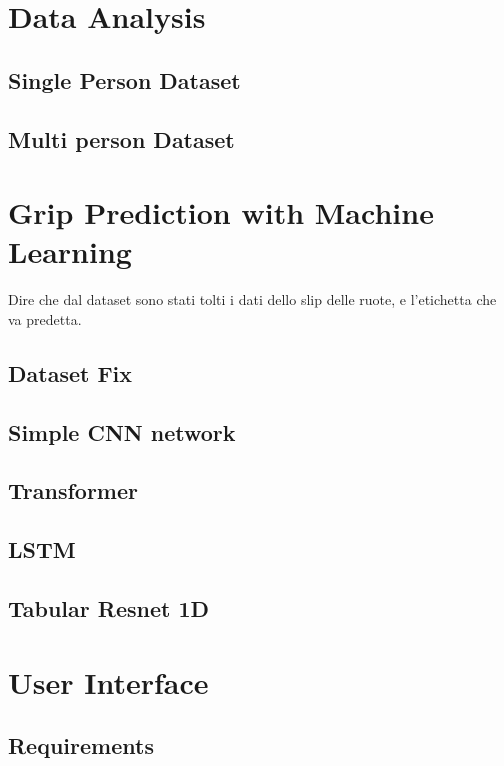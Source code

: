 \documentclass[a4paper,final,12pt]{report}
\begin{document}
\section{Data Analysis}

\subsection{Single Person Dataset}

\subsection{Multi person Dataset}

\section{Grip Prediction with Machine Learning}
Dire che dal dataset sono stati tolti i dati dello slip delle ruote, e l'etichetta che va predetta.

\subsection{Dataset Fix}

\subsection{Simple CNN network}

\subsection{Transformer}

\subsection{LSTM}

\subsection{Tabular Resnet 1D}

\section{User Interface}

\subsection{Requirements}
\end{document}

